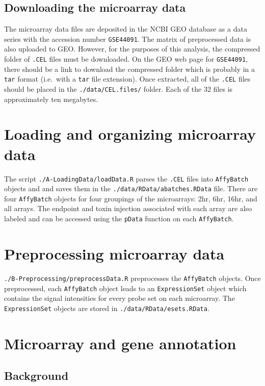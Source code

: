 \subsection{Downloading the microarray data}
The microarray data files are deposited in the NCBI GEO database 
as a data series with the accession number \texttt{GSE44091}. The 
matrix of preprocessed data is also uploaded to GEO. However,
for the purposes of this analysis, the compressed folder of 
\texttt{.CEL} files must be downloaded. On the 
GEO web page for \texttt{GSE44091}, there should be a link
to download the compressed folder which is probably in
a \texttt{tar} format (i\@.e\@.~with a \texttt{tar}
file extension). Once extracted, all of the \texttt{.CEL}
files should be placed in the \texttt{./data/CEL.files/}
folder. Each of the 32 files is approximately ten megabytes.

\section{Loading and organizing microarray data}\label{S:Loading} 
The script \texttt{./A-LoadingData/loadData.R} parses the
\texttt{.CEL} files into \texttt{AffyBatch} objects and
and saves them in the \texttt{./data/RData/abatches.RData} file.
There are four \texttt{AffyBatch} objects for four groupings
of the microarrays: 2hr, 6hr, 16hr, and all arrays.
The endpoint and toxin injection associated with each
array are also labeled and can be accessed using the
\texttt{pData} function on each \texttt{AffyBatch}.

\section{Preprocessing microarray data}\label{S:Preprocessing} 
\texttt{./B-Preprocessing/preprocessData.R} preprocesses
the \texttt{AffyBatch} objects. Once preprocessed, each
\texttt{AffyBatch} object leads to an \texttt{ExpressionSet}
object which contains the signal intensities
for every probe set on each microarray. 
The \texttt{ExpressionSet} objects are stored in
\texttt{./data/RData/esets.RData}.

\section{Microarray and gene annotation}\label{S:Annotations} 

\subsection{Background}

